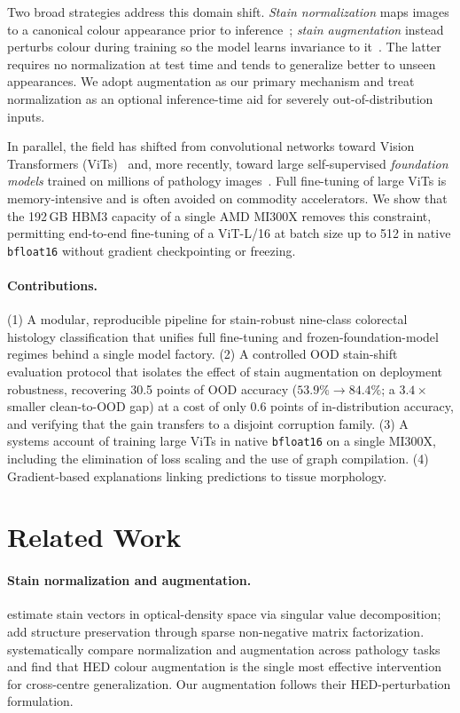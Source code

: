 \documentclass[11pt]{article}
\begin{document}
Two broad strategies address this domain shift. \emph{Stain normalization} maps images to a
canonical colour appearance prior to inference~\citep{macenko2009method,vahadane2016structure};
\emph{stain augmentation} instead perturbs colour during training so the model learns invariance
to it~\citep{tellez2019quantifying}. The latter requires no normalization at test time and tends
to generalize better to unseen appearances. We adopt augmentation as our primary mechanism and
treat normalization as an optional inference-time aid for severely out-of-distribution inputs.

In parallel, the field has shifted from convolutional networks toward Vision Transformers
(ViTs)~\citep{dosovitskiy2021image} and, more recently, toward large self-supervised
\emph{foundation models} trained on millions of pathology images~\citep{filiot2023scaling,
chen2024uni,xu2024gigapath}. Full fine-tuning of large ViTs is memory-intensive and is often
avoided on commodity accelerators. We show that the 192\,GB HBM3 capacity of a single AMD MI300X
removes this constraint, permitting end-to-end fine-tuning of a ViT-L/16 at batch size up to 512
in native \texttt{bfloat16} without gradient checkpointing or freezing.

\paragraph{Contributions.}
(1) A modular, reproducible pipeline for stain-robust nine-class colorectal histology
classification that unifies full fine-tuning and frozen-foundation-model regimes behind a single
model factory. (2) A controlled OOD stain-shift evaluation protocol that isolates the effect of
stain augmentation on deployment robustness, recovering 30.5 points of OOD accuracy
($53.9\%\rightarrow84.4\%$; a $3.4\times$ smaller clean-to-OOD gap) at a cost of only 0.6
points of in-distribution accuracy, and verifying that the gain transfers to a disjoint
corruption family. (3) A systems account of training large ViTs in
native \texttt{bfloat16} on a single MI300X, including the elimination of loss scaling and the use
of graph compilation. (4) Gradient-based explanations linking predictions to tissue morphology.

\section{Related Work}
\paragraph{Stain normalization and augmentation.}
\citet{macenko2009method} estimate stain vectors in optical-density space via singular value
decomposition; \citet{vahadane2016structure} add structure preservation through sparse
non-negative matrix factorization. \citet{tellez2019quantifying} systematically compare
normalization and augmentation across pathology tasks and find that HED colour augmentation is the
single most effective intervention for cross-centre generalization. Our augmentation follows their
HED-perturbation formulation.
\end{document}
